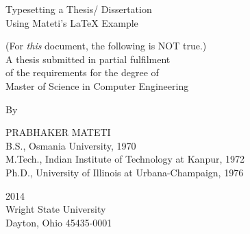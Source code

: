 \thispagestyle{empty}
\begin{center}
{\bf\Huge


Typesetting a Thesis/ Dissertation\\
Using Mateti's {\LaTeX} Example\\ %


}\par\vskip 4cm

(For {\it this} document, the following is NOT true.)\\
A thesis submitted in partial fulfilment\\
of the requirements for the degree of\\
Master of Science in Computer Engineering\\  %

\par\vskip 2cm
By\\
\par\vskip 2cm


PRABHAKER MATETI\\              %
B.S., Osmania University, 1970\\        %
M.Tech., Indian Institute of Technology at Kanpur, 1972\\
Ph.D., University of Illinois at Urbana-Champaign, 1976\\


\vfill

2014\\                          %
Wright State University\\
Dayton, Ohio 45435-0001\\


\end{center}

\newpage


